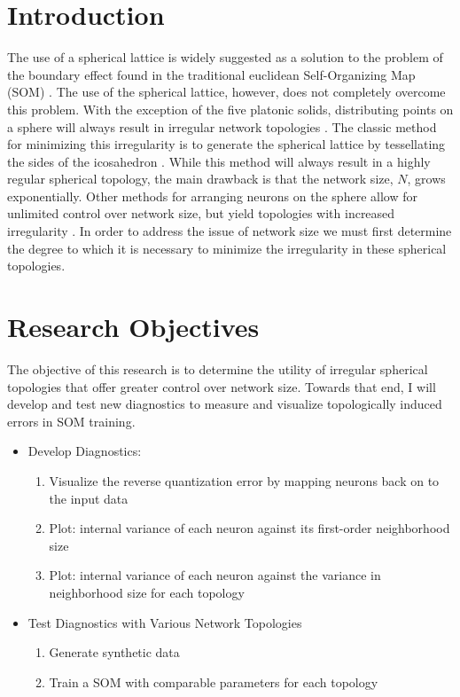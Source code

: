 \documentclass[10pt,titlepage]{article}
\begin{document}
\section{Introduction}
The use of a spherical lattice is widely suggested as a solution to the problem
of the boundary effect found in the traditional euclidean Self-Organizing Map
(SOM) \citep{ritter99, boudjemai2003, sangole03, wu2006, Nishio:2006fk}.  The
use of the spherical lattice, however, does not completely overcome this
problem.  With the exception of the five platonic solids, distributing points on
a sphere will always result in irregular network topologies \citep{ritter99,
harris2000}.  The classic method for minimizing this irregularity is to generate
the spherical lattice by tessellating the sides of the icosahedron
\citep{Nishio:2006fk}.  While this method will always result in a highly regular
spherical topology, the main drawback is that the network size, \(N\), grows
exponentially. Other methods for arranging neurons on the sphere allow for
unlimited control over network size, but yield topologies with increased
irregularity \citep{harris2000, wu2005, Nishio:2006fk}.  In order to address the
issue of network size we must first determine the degree to which it is
necessary to minimize the irregularity in these spherical topologies.

\section{Research Objectives}
The objective of this research is to determine the utility of irregular
spherical topologies that offer greater control over network size. Towards that
end, I will develop and test new diagnostics to measure and visualize
topologically induced errors in SOM training.

\begin{itemize}
	\item Develop Diagnostics:
	\begin{enumerate}
		\item Visualize the reverse quantization error by mapping neurons back on to the input data
    		\item Plot: internal variance of each neuron against its first-order neighborhood size
		\item Plot: internal variance of each neuron against the variance in neighborhood size for each topology
	\end{enumerate}
	\item Test Diagnostics with Various Network Topologies
	\begin{enumerate}
    		\item Generate synthetic data
    		\item Train a SOM with comparable parameters for each topology
	\end{enumerate}
\end{itemize}
\end{document}
